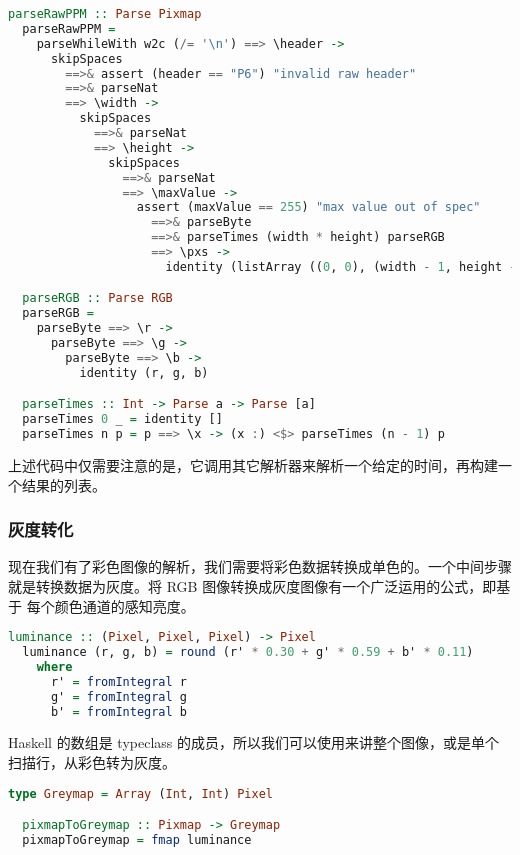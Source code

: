 \documentclass[./main.tex]{subfiles}
\begin{document}
\begin{lstlisting}[language=Haskell]
  parseRawPPM :: Parse Pixmap
  parseRawPPM =
    parseWhileWith w2c (/= '\n') ==> \header ->
      skipSpaces
        ==>& assert (header == "P6") "invalid raw header"
        ==>& parseNat
        ==> \width ->
          skipSpaces
            ==>& parseNat
            ==> \height ->
              skipSpaces
                ==>& parseNat
                ==> \maxValue ->
                  assert (maxValue == 255) "max value out of spec"
                    ==>& parseByte
                    ==>& parseTimes (width * height) parseRGB
                    ==> \pxs ->
                      identity (listArray ((0, 0), (width - 1, height - 1)) pxs)

  parseRGB :: Parse RGB
  parseRGB =
    parseByte ==> \r ->
      parseByte ==> \g ->
        parseByte ==> \b ->
          identity (r, g, b)

  parseTimes :: Int -> Parse a -> Parse [a]
  parseTimes 0 _ = identity []
  parseTimes n p = p ==> \x -> (x :) <$> parseTimes (n - 1) p
\end{lstlisting}

上述代码中仅需要注意的是，它调用其它解析器来解析一个给定的时间，再构建一个结果的列表。

\subsubsection*{灰度转化}

现在我们有了彩色图像的解析，我们需要将彩色数据转换成单色的。一个中间步骤就是转换数据为灰度。将 RGB 图像转换成灰度图像有一个广泛运用的公式，即基于
每个颜色通道的感知亮度。

\begin{lstlisting}[language=Haskell]
  luminance :: (Pixel, Pixel, Pixel) -> Pixel
  luminance (r, g, b) = round (r' * 0.30 + g' * 0.59 + b' * 0.11)
    where
      r' = fromIntegral r
      g' = fromIntegral g
      b' = fromIntegral b
\end{lstlisting}

Haskell 的数组是 typeclass 的成员，所以我们可以使用来讲整个图像，或是单个扫描行，从彩色转为灰度。

\begin{lstlisting}[language=Haskell]
  type Greymap = Array (Int, Int) Pixel

  pixmapToGreymap :: Pixmap -> Greymap
  pixmapToGreymap = fmap luminance
\end{lstlisting}
\end{document}
